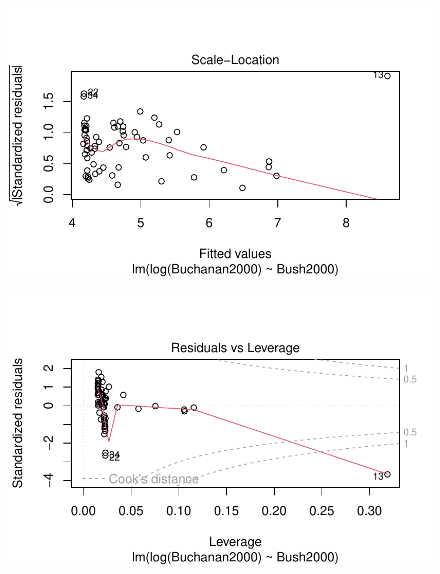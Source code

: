\documentclass[
  letterpaper,
  DIV=11,
  numbers=noendperiod]{scrartcl}
\begin{document}
\begin{figure}[H]

{\centering \includegraphics{case_study_1_files/figure-pdf/unnamed-chunk-4-13.pdf}

}

\end{figure}

\begin{figure}[H]

{\centering \includegraphics{case_study_1_files/figure-pdf/unnamed-chunk-4-14.pdf}

}

\end{figure}
\end{document}
